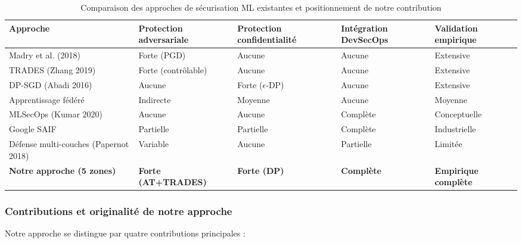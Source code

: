 \begin{table}[htbp]
\centering
\small
\begin{tabular}{|p{3cm}|p{2.5cm}|p{2.5cm}|p{2.5cm}|p{2.5cm}|}
\hline
\textbf{Approche} & \textbf{Protection adversariale} & \textbf{Protection confidentialité} & \textbf{Intégration DevSecOps} & \textbf{Validation empirique} \\
\hline
Madry et al. (2018) & \cellcolor{green!25}Forte (PGD) & \cellcolor{red!25}Aucune & \cellcolor{red!25}Aucune & \cellcolor{green!25}Extensive \\
\hline
TRADES (Zhang 2019) & \cellcolor{green!25}Forte (contrôlable) & \cellcolor{red!25}Aucune & \cellcolor{red!25}Aucune & \cellcolor{green!25}Extensive \\
\hline
DP-SGD (Abadi 2016) & \cellcolor{red!25}Aucune & \cellcolor{green!25}Forte ($\epsilon$-DP) & \cellcolor{red!25}Aucune & \cellcolor{green!25}Extensive \\
\hline
Apprentissage fédéré & \cellcolor{yellow!25}Indirecte & \cellcolor{yellow!25}Moyenne & \cellcolor{red!25}Aucune & \cellcolor{yellow!25}Moyenne \\
\hline
MLSecOps (Kumar 2020) & \cellcolor{red!25}Aucune & \cellcolor{red!25}Aucune & \cellcolor{green!25}Complète & \cellcolor{red!25}Conceptuelle \\
\hline
Google SAIF & \cellcolor{yellow!25}Partielle & \cellcolor{yellow!25}Partielle & \cellcolor{green!25}Complète & \cellcolor{yellow!25}Industrielle \\
\hline
Défense multi-couches (Papernot 2018) & \cellcolor{yellow!25}Variable & \cellcolor{red!25}Aucune & \cellcolor{yellow!25}Partielle & \cellcolor{red!25}Limitée \\
\hline
\textbf{Notre approche (5 zones)} & \cellcolor{green!25}\textbf{Forte (AT+TRADES)} & \cellcolor{green!25}\textbf{Forte (DP)} & \cellcolor{green!25}\textbf{Complète} & \cellcolor{green!25}\textbf{Empirique complète} \\
\hline
\end{tabular}
\caption{Comparaison des approches de sécurisation ML existantes et positionnement de notre contribution}
\label{tab:comparatif}
\end{table}

\subsubsection{Contributions et originalité de notre approche}

Notre approche se distingue par quatre contributions principales :

